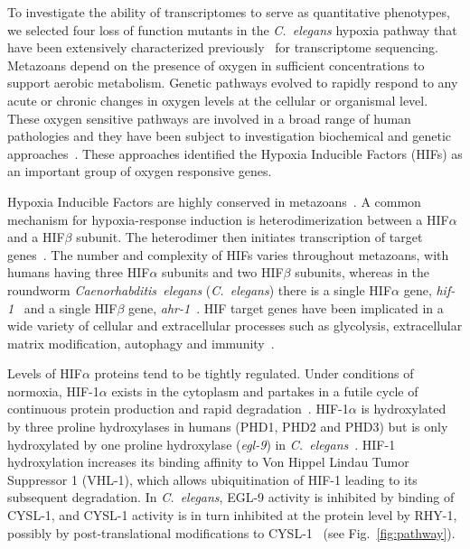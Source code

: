\documentclass[9pt,twocolumn,twoside]{pnas-new}
\newcommand{\cel}{\emph{C.~elegans}}
\newcommand{\gene}[1]{\emph{#1}}
\newcommand{\eglp}{EGL-9}
\newcommand{\rhyp}{RHY-1}
\newcommand{\vhlp}{VHL-1}
\newcommand{\hifp}{HIF-1}
\newcommand{\cyslp}{CYSL-1}
\begin{document}
To investigate the ability of transcriptomes to serve as quantitative phenotypes,
we selected four loss of function mutants in the \cel{} hypoxia pathway that have
been extensively characterized previously~\cite{Epstein2001,Shen2006,Shao2009,Jiang2001}
for transcriptome sequencing.
Metazoans depend on the presence of oxygen in sufficient concentrations to
support aerobic metabolism. Genetic pathways evolved to rapidly respond to any
acute or chronic changes in oxygen levels at the cellular or organismal level.
These oxygen sensitive pathways are involved in a broad range of human
pathologies and they have been subject to investigation biochemical and
genetic approaches~\cite{Semenza2012}. These approaches identified the Hypoxia
Inducible Factors (HIFs) as an important group of oxygen responsive genes.

Hypoxia Inducible Factors are highly conserved in metazoans~\cite{Loenarz2011}.
A common mechanism for hypoxia-response induction is heterodimerization between a
HIF$\alpha$ and a HIF$\beta$ subunit. The heterodimer then initiates
transcription of target genes~\cite{Jiang1996}. The number and complexity of HIFs varies
throughout metazoans, with humans having three HIF$\alpha$ subunits and two
HIF$\beta$ subunits, whereas in the roundworm \emph{Caenorhabditis~elegans}
(\cel{}) there is a single HIF$\alpha$ gene, \gene{hif-1}~\cite{Jiang2001} and a single HIF$\beta$
gene, \gene{ahr-1}~\cite{Powell-Coffman1998}. HIF target genes have been implicated
in a wide variety of cellular and extracellular processes such as glycolysis,
extracellular matrix modification, autophagy and immunity~\cite{Semenza1994,
Bishop2004,Shen2005,Bellier2009,Semenza2012}.

Levels of HIF$\alpha$ proteins tend to be tightly regulated. Under conditions of
normoxia, \hifp{}$\alpha$ exists in the cytoplasm and partakes in a futile cycle
of continuous protein production and rapid degradation~\cite{Huang1996}.
\hifp{}$\alpha$ is hydroxylated by three proline hydroxylases
in humans (PHD1, PHD2 and PHD3) but is only hydroxylated by one proline
hydroxylase (\gene{egl-9}) in \cel{}~\cite{Kaelin2008}. \hifp{} hydroxylation
increases its binding affinity to Von Hippel Lindau Tumor Suppressor 1
(\vhlp{}), which allows ubiquitination of \hifp{} leading to its subsequent
degradation. In \cel{}, \eglp{} activity is inhibited by binding of \cyslp{},
and \cyslp{} activity is in turn inhibited at the protein level by \rhyp{},
possibly by post-translational modifications to \cyslp{}~\cite{Ma2012} (see
Fig.~\ref{fig:pathway}).
\end{document}
